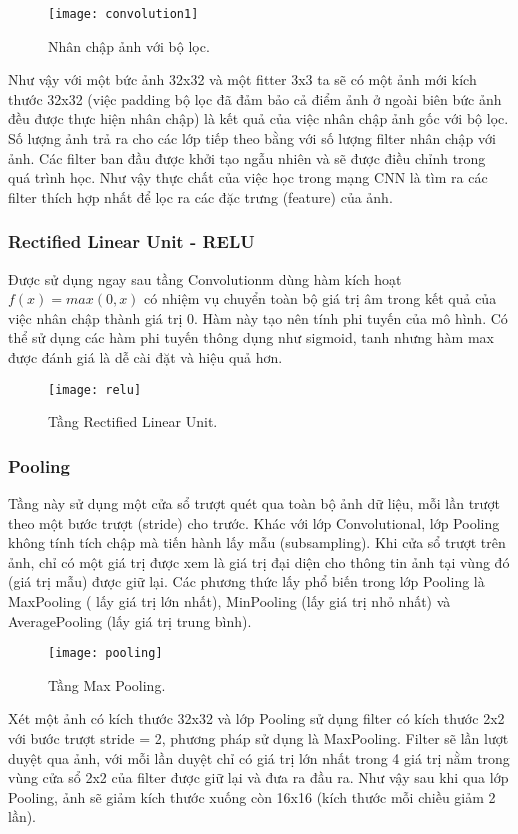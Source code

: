 \documentclass[13pt, a4paper]{extreport}
\begin{document}
\begin{figure}[H]
  \centering
    \texttt{[image: convolution1]}
   \caption{\large Nhân chập ảnh với bộ lọc.}
\end{figure}

\indent Như vậy với một bức ảnh 32x32 và một fitter 3x3 ta sẽ có một ảnh mới kích thước 32x32 (việc padding bộ lọc đã đảm bảo cả điểm ảnh ở ngoài biên bức ảnh đều được thực hiện nhân chập) là kết quả của việc nhân chập ảnh gốc với bộ lọc. Số lượng ảnh trả ra cho các lớp tiếp theo bằng với số lượng filter nhân chập với ảnh. Các filter ban đầu được khởi tạo ngẫu nhiên và sẽ được điều chỉnh trong quá trình học. Như vậy thực chất của việc học trong mạng CNN là tìm ra các filter thích hợp nhất để lọc ra các đặc trưng (feature) của ảnh.
\subsubsection{Rectified Linear Unit - RELU}
\indent Được sử dụng ngay sau tầng Convolutionm dùng hàm kích hoạt $f(x) = max(0, x)$ có nhiệm vụ chuyển toàn bộ giá trị âm trong kết quả của việc nhân chập thành giá trị 0. Hàm này tạo nên tính phi tuyến của mô hình. Có thể sử dụng các hàm phi tuyến thông dụng như sigmoid, tanh nhưng hàm max được đánh giá là dễ cài đặt và hiệu quả hơn.
\begin{figure}[H]
  \centering
    \texttt{[image: relu]}
   \caption{\large Tầng Rectified Linear Unit.}
\end{figure}
\subsubsection{Pooling}
\indent Tầng này sử dụng một cửa sổ trượt quét qua toàn bộ ảnh dữ liệu, mỗi lần trượt theo một bước trượt (stride) cho trước. Khác với lớp Convolutional, lớp Pooling không tính tích chập mà tiến hành lấy mẫu (subsampling). Khi cửa sổ trượt trên ảnh, chỉ có một giá trị được xem là giá trị đại diện cho thông tin ảnh tại vùng đó (giá trị mẫu) được giữ lại. Các phương thức lấy phổ biến trong lớp Pooling là MaxPooling ( lấy giá trị lớn nhất), MinPooling (lấy giá trị nhỏ nhất) và AveragePooling (lấy giá trị trung bình).
\begin{figure}[H]
  \centering
    \texttt{[image: pooling]}
   \caption{\large Tầng Max Pooling.}
\end{figure}

\indent Xét một ảnh có kích thước 32x32 và lớp Pooling sử dụng filter có kích thước 2x2 với bước trượt stride = 2, phương pháp sử dụng là MaxPooling. Filter sẽ lần lượt duyệt qua ảnh, với mỗi lần duyệt chỉ có giá trị lớn nhất trong 4 giá trị nằm trong vùng cửa sổ 2x2 của filter được giữ lại và đưa ra đầu ra. Như vậy sau khi qua lớp Pooling, ảnh sẽ giảm kích thước xuống còn 16x16 (kích thước mỗi chiều giảm 2 lần).
\end{document}

